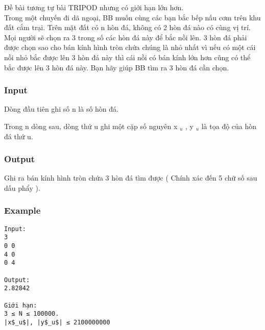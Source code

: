 



   Đề bài tương tự bài TRIPOD nhưng có giới hạn lớn hơn.   
\\   Trong một chuyến đi dã ngoại, BB muốn cùng các bạn bắc bếp nấu cơm trên khu đất cắm trại. Trên mặt đất có n hòn đá, không có 2 hòn đá nào có cùng vị trí. Mọi người sẽ chọn ra 3 trong số các hòn đá này để bắc nồi lên. 3 hòn đá phải được chọn sao cho bán kính hình tròn chứa chúng là nhỏ nhất vì nếu có một cái nồi nhỏ bắc được lên 3 hòn đá này thì cái nồi có bán kính lớn hơn cũng có thể bắc được lên 3 hòn đá này. Bạn hãy giúp BB tìm ra 3 hòn đá cần chọn.  

\subsubsection{   Input  }

   Dòng đầu tiên ghi số n là số hòn đá.  

   Trong n dòng sau, dòng thứ u ghi một cặp số nguyên x   $_    u   $   , y   $_    u   $   là tọa độ của hòn đá thứ u.  

\subsubsection{   Output  }

   Ghi ra bán kính hình tròn chứa 3 hòn đá tìm được ( Chính xác đến 5 chữ số sau dấu phẩy ).  

\subsubsection{   Example  }
\begin{verbatim}
Input:
3
0 0
4 0
0 4

Output:
2.82842

Giới hạn:
3 ≤ N ≤ 100000. 
|x$_u$|, |y$_u$| ≤ 2100000000

\end{verbatim}